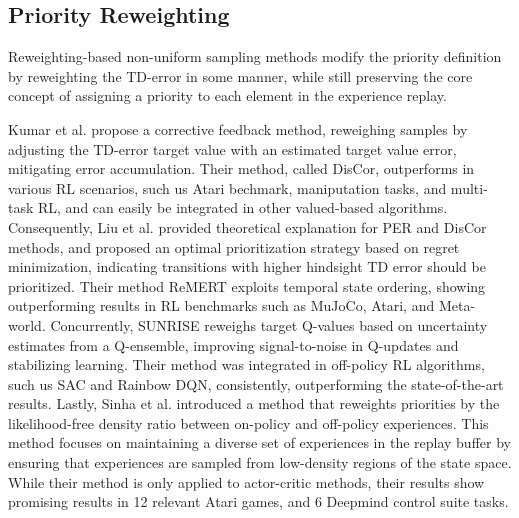 
\subsection{Priority Reweighting}

Reweighting-based non-uniform sampling methods modify the priority definition by reweighting the TD-error in some manner, while still preserving the core concept of assigning a priority to each element in the experience replay.

Kumar et al. \cite{kumar2020discor} propose a corrective feedback method, reweighing samples by adjusting the TD-error target value with an estimated target value error, mitigating error accumulation. Their method, called DisCor, outperforms in various RL scenarios, such us Atari bechmark, maniputation tasks, and multi-task RL, and can easily be integrated in other valued-based algorithms. Consequently, Liu et al. \cite{liu2021regret} provided theoretical explanation for PER and DisCor methods, and proposed an optimal prioritization strategy based on regret minimization, indicating transitions with higher hindsight TD error should be prioritized. Their method ReMERT exploits temporal state ordering, showing outperforming results in RL benchmarks such as MuJoCo, Atari, and Meta-world. Concurrently, SUNRISE \cite{lee2021sunrise} reweighs target Q-values based on uncertainty estimates from a Q-ensemble, improving signal-to-noise in Q-updates and stabilizing learning. Their method was integrated in off-policy RL algorithms, such us SAC and Rainbow DQN, consistently, outperforming the state-of-the-art results. Lastly, Sinha et al. \cite{sinha2022experience} introduced a method that reweights priorities by the likelihood-free density ratio between on-policy and off-policy experiences. This method focuses on maintaining a diverse set of experiences in the replay buffer by ensuring that experiences are sampled from low-density regions of the state space. While their method is only applied to actor-critic methods, their results show promising results in 12 relevant Atari games, and 6 Deepmind control suite tasks.



